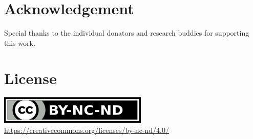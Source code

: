 \documentclass[12pt]{../document-templates/papers/one-column-mydashie/mydashie}
\newtheorem*{theorem A}{Theorem A}
\newtheorem*{theorem B}{N\"olker's Theorem}
\theoremstyle{remark}
\theoremstyle{remark}
\begin{document}
\section*{Acknowledgement} 
Special thanks to the individual donators and research buddies for supporting this work.
%
%
%

\nocite{*}


\section*{License}
\label{s:license}
\begin{center}
	\includegraphics{by-nc-nd.png} \\
	\url{https://creativecommons.org/licenses/by-nc-nd/4.0/}
\end{center}
\end{document}
